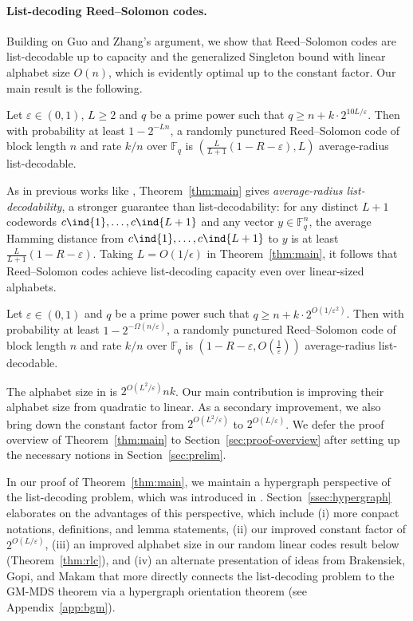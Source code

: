 \documentclass{article}[11pt]
\begin{document}
  \paragraph{List-decoding Reed--Solomon codes.}

  Building on Guo and Zhang's argument, we show that Reed--Solomon codes are list-decodable up to capacity and the generalized Singleton bound with linear alphabet size $O(n)$, which is evidently optimal up to the constant factor.
  Our main result is the following.


\begin{theorem}
  Let $\varepsilon\in(0,1)$, $L\ge 2$ and $q$ be a prime power such that $q\ge n+k\cdot 2^{10L/\varepsilon}$. Then with probability at least $1-2^{-Ln}$, a randomly punctured Reed--Solomon code of block length $n$ and rate $k/n$ over $\mathbb{F}_q$ is $(\frac{L}{L+1}(1-R-\varepsilon),L)$ average-radius list-decodable.
  \label{thm:main}
\end{theorem}

As in previous works like \cite{BGM23,GZ23}, Theorem~\ref{thm:main} gives \emph{average-radius list-decodability}, a stronger guarantee than list-decodability: for any distinct $L+1$ codewords $c\ind{1},\dots,c\ind{L+1}$ and any vector $y\in\mathbb{F}_q^n$, the average Hamming distance from $c\ind{1},\dots,c\ind{L+1}$ to $y$ is at least $\frac{L}{L+1}(1-R-\varepsilon)$.
Taking $L=O(1/\epsilon)$ in Theorem~\ref{thm:main}, it follows that Reed--Solomon codes achieve list-decoding capacity even over linear-sized alphabets.
\begin{corollary}
  Let $\varepsilon\in(0,1)$ and $q$ be a prime power such that $q\ge n+k\cdot 2^{O(1/\varepsilon^2)}$. Then with probability at least $1-2^{-\Omega(n/\varepsilon)}$, a randomly punctured Reed--Solomon code of block length $n$ and rate $k/n$ over $\mathbb{F}_q$ is $(1-R-\varepsilon,O(\frac{1}{\varepsilon}))$ average-radius list-decodable.
  \label{cor:main}
\end{corollary}
The alphabet size in \cite{GZ23} is $2^{O(L^2/\varepsilon)}nk$.
Our main contribution is improving their alphabet size from quadratic to linear.
As a secondary improvement, we also bring down the constant factor from $2^{O(L^2/\varepsilon)}$ to $2^{O(L/\varepsilon)}$. We defer the proof overview of Theorem~\ref{thm:main} to Section~\ref{sec:proof-overview} after setting up the necessary notions in Section~\ref{sec:prelim}.

In our proof of Theorem~\ref{thm:main}, we maintain a hypergraph perspective of the list-decoding problem, which was introduced in \cite{GLSTW21}. Section~\ref{ssec:hypergraph} elaborates on the advantages of this perspective, which include (i) more conpact notations, definitions, and lemma statements, (ii) our improved constant factor of $2^{O(L/\varepsilon)}$, (iii) an improved alphabet size in our random linear codes result below (Theorem~\ref{thm:rlc}), and (iv) an alternate presentation of ideas from Brakensiek, Gopi, and Makam \cite{BGM23} that more directly connects the list-decoding problem to the GM-MDS theorem \cite{DauSY14,Lovett18,YildizH19} via a hypergraph orientation theorem (see Appendix~\ref{app:bgm}).  
\end{document}
